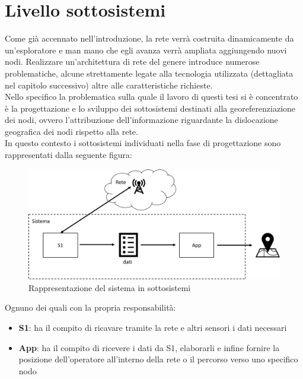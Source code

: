 \section{Livello sottosistemi}
Come già accennato nell'introduzione, la rete verrà costruita dinamicamente da un'esploratore e man mano che egli avanza verrà ampliata aggiungendo nuovi nodi.
Realizzare un'architettura di rete del genere introduce numerose problematiche, alcune strettamente legate alla tecnologia utilizzata (dettagliata nel capitolo successivo) altre alle caratteristiche richieste.\\
Nello specifico la problematica sulla quale il lavoro di questi tesi si è concentrato è la progettazione e lo sviluppo dei sottosistemi destinati alla georeferenziazione dei nodi, ovvero l'attribuzione dell'informazione riguardante la dislocazione geografica dei nodi rispetto alla rete.\\
In questo contesto i sottosistemi individuati nella fase di progettazione sono rappresentati dalla seguente figura: 
\begin{figure}[H]
	\centering
	\includegraphics[scale=0.3]{DescrizioneDelSistema/sistema_liv1.png}
	\caption{Rappresentazione del sistema in sottosistemi }
	\label{fig:sistema_liv1}
\end{figure}

Ognuno dei quali con la propria responsabilità:
\begin{itemize}
	\item \textbf{S1}: ha il compito di ricavare tramite la rete e altri sensori i dati necessari
	\item \textbf{App}: ha il compito di ricevere i dati da S1, elaborarli e infine fornire la posizione dell'operatore all'interno della rete o il percorso verso uno specifico nodo
\end{itemize}


